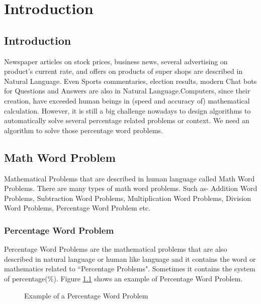 \documentclass[document.tex]{subfiles}
\begin{document}
\chapter{Introduction}
\section{Introduction}
Newspaper articles on stock prices, business news, several advertising on product’s current rate, and offers on products of
super shops are described in Natural Language. Even Sports
commentaries, election results, modern Chat bots for Questions
and Answers are also in Natural Language.Computers, since their creation, have exceeded human beings in (speed and accuracy of) mathematical calculation. However, it is still a big challenge nowadays to design algorithms to automatically solve several percentage related problems or context. We need an algorithm to solve those percentage word problems.

\section{Math Word Problem}
\noindent Mathematical Problems that are described in human language called Math Word Problems. There are many types of math word problems. Such as- Addition Word Problems, Subtraction Word Problems, Multiplication Word Problems, Division Word Problems, Percentage Word Problem etc. 
\subsection{Percentage Word Problem}
\noindent Percentage Word Problems are the mathematical problems that are also described in natural language or human like language and it contains the word or mathematics related to ``Percentage Problems". Sometimes it contains the system of percentage(\%). Figure \ref{fig:a} shows an example of Percentage Word Problem.
\begin{figure}[H] 
	\caption{Example of a Percentage Word Problem}
	\label{fig:a}
\end{figure}
\end{document}
